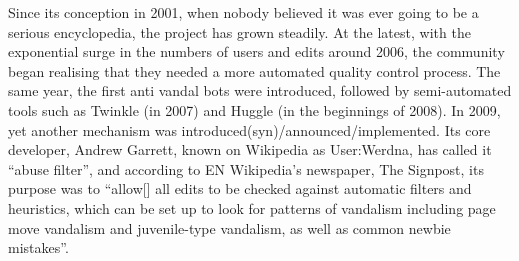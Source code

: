 Since its conception in 2001, when nobody believed it was ever going to be a serious encyclopedia, the project has grown steadily.
At the latest, with the exponential surge in the numbers of users and edits around 2006, the community began realising that they needed a more automated quality control process.
The same year, the first anti vandal bots were introduced, followed by semi-automated tools such as Twinkle (in 2007) and Huggle (in the beginnings of 2008).
In 2009, yet another mechanism was introduced(syn)/announced/implemented.
Its core developer, Andrew Garrett, known on Wikipedia as User:Werdna, has called it ``abuse filter'', and according to EN Wikipedia's newspaper, The Signpost, its purpose was to ``allow[] all edits to be checked against automatic filters and heuristics, which can be set up to look for patterns of vandalism including page move vandalism and juvenile-type vandalism, as well as common newbie mistakes''.

\begin{comment}
Don't make it a separate subsection, but use it to introduce the topic with a story, the way Geiger does.
If the genesis doesn't make sense here, move it to Edit filters

Nice quote:
The Wikipedia Revolution: How A Bunch of Nobodies Created The World's Greatest Encyclopedia is a 2009 popular history book by new media researcher and writer Andrew Lih.

\cite{HalGeiMorRied2013}
"formalization of implicit norms into rules, and the embedding of these rules in technologies
such as bots and templates," //code is law

"decline-era newcomers may face entrenched social practices and
technologically-embedded processes that are no longer open to re-negotiation"
"policy calcification and increasing centralization of policy"

"Wikipedia has changed from “the encyclopedia that anyone can edit” to “the encyclopedia that
anyone who understands the norms, socializes him or herself, dodges the impersonal wall of
semi-automated rejection and still wants to voluntarily contribute his or her time and energy can
edit”"

\cite{Tkacz2014}
"As historical artifacts, encyclopedias have regularly offered great insight into the periods in which they were written. They tell us about what constitutes knowledge at a particular time as well as how the various bodies of knowledge were thought to relate to one another." (p.4)

Knowledge production must meet certain standards.
Keeping rubbish out.
But who decides what is legitimate knowledge that gets to be represented, and what gets shut out?
This is a story about one quality assurance mechanism.
That has the power to keep stuff out.
Which stuff?
\end{comment}

